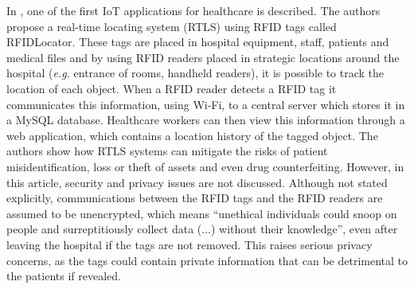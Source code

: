 In \cite{Fuhrer2006}, one of the first \acs{IoT} applications for healthcare is described. The authors propose a real-time locating system (RTLS) using \acs{RFID} tags called RFIDLocator. These tags are placed in hospital equipment, staff, patients and medical files and by using \acs{RFID} readers placed in strategic locations around the hospital (\textit{e.g.} entrance of rooms, handheld readers), it is possible to track the location of each object. When a \acs{RFID} reader detects a \acs{RFID} tag it communicates this information, using Wi-Fi, to a central server which stores it in a MySQL database. Healthcare workers can then view this information through a web application, which contains a location history of the tagged object. The authors show how RTLS systems can mitigate the risks of patient misidentification, loss or theft of assets and even drug counterfeiting. However, in this article, security and privacy issues are not discussed. Although not stated explicitly, communications between the RFID tags and the RFID readers are assumed to be unencrypted, which means ``unethical individuals could snoop on people and surreptitiously collect data (...) without their knowledge'', even after leaving the hospital if the tags are not removed. This raises serious privacy concerns, as the tags could contain private information that can be detrimental to the patients if revealed. \bigskip

% 


